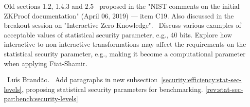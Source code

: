 Old sections 1.2, 1.4.3 and 2.5
\newcol \ccontext\ proposed in the "NIST comments on the initial ZKProof documentation" (April 06, 2019) --- item C19. Also discussed in the breakout session on "Interactive Zero Knowledge".
				\propContrib\ Discuss various examples of acceptable values of statistical security parameter, e.g., 40 bits. Explore how interactive to non-interactive transformations may affect the requirements on the statistical security parameter, e.g., making it become a computational parameter when applying Fiat-Shamir.
				
\newcol {}
\newcol \contributors\ Luís Brandão.
				\Chan\ Add paragraphs in new subsection~\ref{security:efficiency:stat-sec-levels}, proposing statistical security parameters for benchmarking.
\newcol \ref{rev:stat-sec-par:bench:security-levels}
\rowendL
\myendIssue



